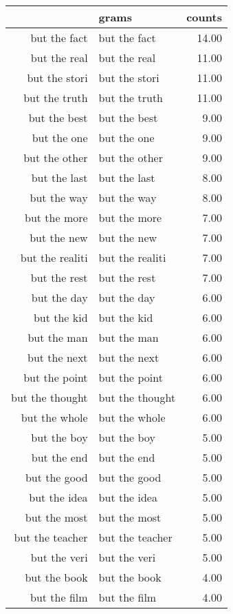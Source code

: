 \begin{table}[ht]
\centering
\begin{tabular}{rlr}
  \hline
 & grams & counts \\ 
  \hline
but the fact & but the fact & 14.00 \\ 
  but the real & but the real & 11.00 \\ 
  but the stori & but the stori & 11.00 \\ 
  but the truth & but the truth & 11.00 \\ 
  but the best & but the best & 9.00 \\ 
  but the one & but the one & 9.00 \\ 
  but the other & but the other & 9.00 \\ 
  but the last & but the last & 8.00 \\ 
  but the way & but the way & 8.00 \\ 
  but the more & but the more & 7.00 \\ 
  but the new & but the new & 7.00 \\ 
  but the realiti & but the realiti & 7.00 \\ 
  but the rest & but the rest & 7.00 \\ 
  but the day & but the day & 6.00 \\ 
  but the kid & but the kid & 6.00 \\ 
  but the man & but the man & 6.00 \\ 
  but the next & but the next & 6.00 \\ 
  but the point & but the point & 6.00 \\ 
  but the thought & but the thought & 6.00 \\ 
  but the whole & but the whole & 6.00 \\ 
  but the boy & but the boy & 5.00 \\ 
  but the end & but the end & 5.00 \\ 
  but the good & but the good & 5.00 \\ 
  but the idea & but the idea & 5.00 \\ 
  but the most & but the most & 5.00 \\ 
  but the teacher & but the teacher & 5.00 \\ 
  but the veri & but the veri & 5.00 \\ 
  but the book & but the book & 4.00 \\ 
  but the film & but the film & 4.00 \\ 

\end{tabular}
\end{table}
